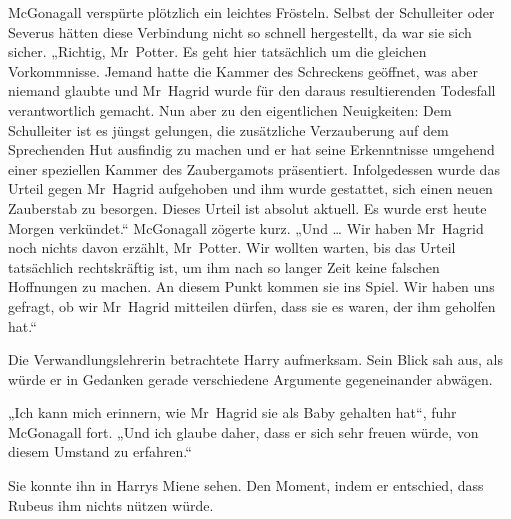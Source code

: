 McGonagall verspürte plötzlich ein leichtes Frösteln. Selbst der Schulleiter oder Severus hätten diese Verbindung nicht so schnell hergestellt, da war sie sich sicher.
„Richtig, Mr~Potter. Es geht hier tatsächlich um die gleichen Vorkommnisse. Jemand hatte die Kammer des Schreckens geöffnet, was aber niemand glaubte und Mr~Hagrid wurde für den daraus resultierenden Todesfall verantwortlich gemacht. Nun aber zu den eigentlichen Neuigkeiten: Dem Schulleiter ist es jüngst gelungen, die zusätzliche Verzauberung auf dem Sprechenden Hut ausfindig zu machen und er hat seine Erkenntnisse umgehend einer speziellen Kammer des Zaubergamots präsentiert. Infolgedessen wurde das Urteil gegen Mr~Hagrid aufgehoben und ihm wurde gestattet, sich einen neuen Zauberstab zu besorgen. Dieses Urteil ist absolut aktuell. Es wurde erst heute Morgen verkündet.“ McGonagall zögerte kurz.
„Und … Wir haben Mr~Hagrid noch nichts davon erzählt, Mr~Potter. Wir wollten warten, bis das Urteil tatsächlich rechtskräftig ist, um ihm nach so langer Zeit keine falschen Hoffnungen zu machen. An diesem Punkt kommen sie ins Spiel. Wir haben uns gefragt, ob wir Mr~Hagrid mitteilen dürfen, dass sie es waren, der ihm geholfen hat.“

Die Verwandlungslehrerin betrachtete Harry aufmerksam. Sein Blick sah aus, als würde er in Gedanken gerade verschiedene Argumente gegeneinander abwägen.

„Ich kann mich erinnern, wie Mr~Hagrid sie als Baby gehalten hat“, fuhr McGonagall fort.
„Und ich glaube daher, dass er sich sehr freuen würde, von diesem Umstand zu erfahren.“

Sie konnte ihn in Harrys Miene sehen. Den Moment, indem er entschied, dass Rubeus ihm nichts nützen würde.


